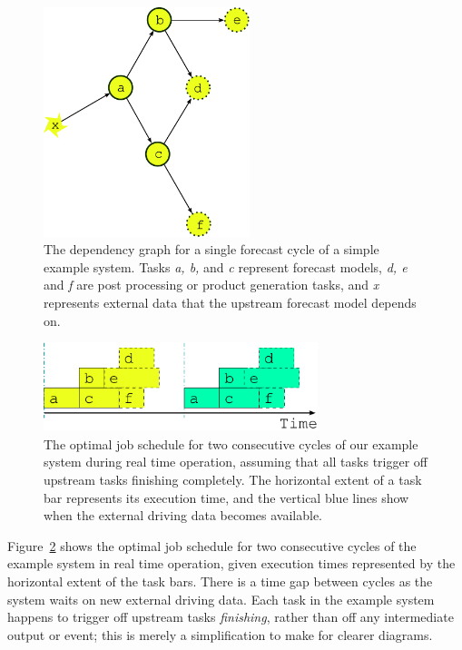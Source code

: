 \documentclass[11pt,a4paper]{article}
\begin{document}
\begin{figure} \label{fig-dep-one} 
    \begin{center}
        \includegraphics[width=6cm]{inkscape-svg/dep-one-cycle} 
    \end{center}
    \caption[Single cycle dependency graph for a simple system]{\small
    The dependency graph for a single forecast cycle of a simple example
    system. Tasks {\em a, b,} and {\em c} represent forecast models,
    {\em d, e} and {\em f} are post processing or product generation
    tasks, and {\em x} represents external data that the upstream
    forecast model depends on.}
\end{figure} 

\begin{figure} \label{fig-time-one}
    \begin{center}
        \includegraphics[width=8cm]{inkscape-svg/timeline-one}
    \end{center}
    \caption[Single cycle job schedules for real time operation]{\small
    The optimal job schedule for two consecutive cycles of our example
    system during real time operation, assuming that all tasks trigger 
    off upstream tasks finishing completely. The horizontal extent of
    a task bar represents its execution time, and the vertical blue
    lines show when the external driving data becomes available.}
\end{figure}

Figure~\ref{fig-time-one} shows the optimal job schedule for two
consecutive cycles of the example system in real time operation, given
execution times represented by the horizontal extent of the task bars.
There is a time gap between cycles as the system waits on new external
driving data.  Each task in the example system happens to trigger off
upstream tasks {\em finishing}, rather than off any intermediate output
or event; this is merely a simplification to make for clearer diagrams.
\end{document}
